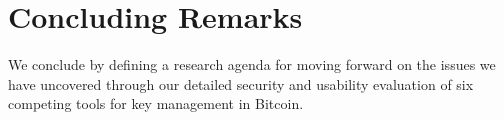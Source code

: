 

\section{Concluding Remarks}

We conclude by defining a research agenda for moving forward on the issues we have uncovered through our detailed security and usability evaluation of six competing tools for key management in Bitcoin. 

